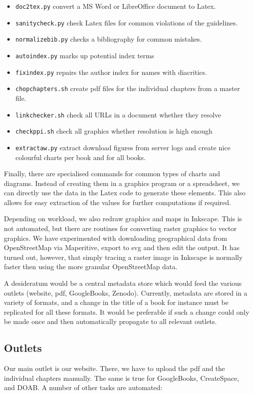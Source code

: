 \documentclass[guidelines,nonflat,modfonts] {langsci/langscibook}
\begin{document}
\begin{itemize}
 \item \texttt{doc2tex.py} convert a MS Word or LibreOffice document to Latex.
 \item \texttt{sanitycheck.py} check Latex files for common violations of the guidelines.
 \item \texttt{normalizebib.py} checks a bibliography for common mistakes. 
 \item \texttt{autoindex.py} marks up potential index terms 
 \item \texttt{fixindex.py} repairs the author index for names with diacritics.
 \item \texttt{chopchapters.sh} create pdf files for the individual chapters from a master file. 
 \item \texttt{linkchecker.sh} check all URLs in a document whether they resolve
 \item \texttt{checkppi.sh} check all graphics whether resolution is high enough
 \item \texttt{extractaw.py} extract download figures from server logs and create nice colourful charts per book and for all books. 
\end{itemize}

Finally, there are specialised commands for common types of charts and diagrams. Instead of creating them in a graphics program or a spreadsheet, we can directly use the data in the Latex code to generate these elements. This also allows for easy extraction of the values for further computations if required. 

Depending on workload, we also redraw graphics and maps in Inkscape. This is not automated, but there are routines for converting raster graphics to vector graphics. We have experimented with downloading geographical data from OpenStreetMap via Maperitive, export to svg and then edit the output. It has turned out, however, that simply tracing a raster image in Inkscape is normally faster then using the more granular OpenStreetMap data. 

A desideratum would be a central metadata store which would feed the various outlets (website, pdf, GoogleBooks, Zenodo). Currently, metadata are stored in a variety of formats, and a change in the title of a book for instance must be replicated for all these formats. It would be preferable if such a change could only be made once and then automatically propagate to all relevant outlets.

\subsection{Outlets}
Our main outlet is our website. There, we have to upload the pdf and the individual chapters manually. The same is true for GoogleBooks, CreateSpace, and DOAB. A number of other tasks are automated:
\end{document}
